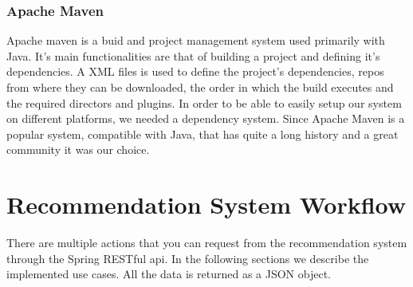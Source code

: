 \lstset{caption=Stanford Core NLP lemmatizer code, label=lst:stanford-core-nlp}


\subsubsection{Apache Maven}
\label{sec:frameworks-apache-maven}
Apache maven is a buid and project management system used primarily with Java. It's main functionalities are that of building a project and defining it's dependencies. A XML files is used to define the project's dependencies, repos from where they can be downloaded, the order in which the build executes and the required directors and plugins.
In order to be able to easily setup our system on different platforms, we needed a dependency system. Since Apache Maven is a popular system, compatible with Java, that has quite a long history and a great community it was our choice.

\section{Recommendation System Workflow} 
\label{sec:workflow}
There are multiple actions that you can request from the recommendation system through the Spring RESTful api.
In the following sections we describe the implemented use cases.
All the data is returned as a JSON object.

\hfill \break
\hfill \break
\hfill \break
\hfill \break

